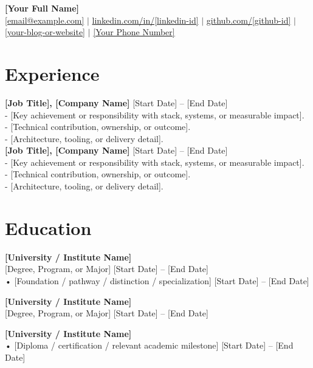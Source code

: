 \documentclass[10pt,letterpaper]{article}
\begin{document}
\noindent

\begin{center}
{\LARGE \textbf{[Your Full Name]}} \\
\href{mailto:[email@example.com]}{[email@example.com]} $\vert$
\href{https://www.linkedin.com/in/[linkedin-id]/}{linkedin.com/in/[linkedin-id]} $\vert$
\href{https://github.com/[github-id]}{github.com/[github-id]} $\vert$
\href{https://[your-blog-or-website]}{[your-blog-or-website]} $\vert$
\href{tel:[your-phone-number]}{[Your Phone Number]}
\end{center}

\section*{Experience}

\textbf{[Job Title], [Company Name]} \hfill [Start Date] -- [End Date] \\
- [Key achievement or responsibility with stack, systems, or measurable impact]. \\
- [Technical contribution, ownership, or outcome]. \\
- [Architecture, tooling, or delivery detail]. \\

\textbf{[Job Title], [Company Name]} \hfill [Start Date] -- [End Date] \\
- [Key achievement or responsibility with stack, systems, or measurable impact]. \\
- [Technical contribution, ownership, or outcome]. \\
- [Architecture, tooling, or delivery detail].

\section*{Education}

\textbf{[University / Institute Name]} \\
{[Degree, Program, or Major]} \hfill {[Start Date] -- [End Date]} \\
• [Foundation / pathway / distinction / specialization] \hfill {[Start Date] -- [End Date]}

\textbf{[University / Institute Name]} \\
{[Degree, Program, or Major]} \hfill {[Start Date] -- [End Date]}

\textbf{[University / Institute Name]} \\
• [Diploma / certification / relevant academic milestone] \hfill {[Start Date] -- [End Date]}
\end{document}

